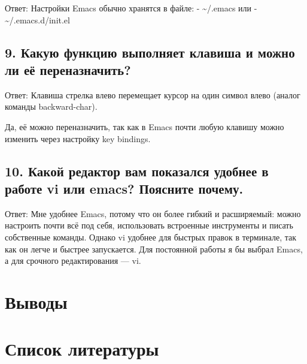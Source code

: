 \documentclass[
  english,
  russian,
  12pt,
  a4paper,
]{scrreprt}
\begin{document}
Ответ: Настройки Emacs обычно хранятся в файле: - \textasciitilde/.emacs
или - \textasciitilde/.emacs.d/init.el

\section{9. Какую функцию выполняет клавиша и можно ли её
переназначить?}\label{ux43aux430ux43aux443ux44e-ux444ux443ux43dux43aux446ux438ux44e-ux432ux44bux43fux43eux43bux43dux44fux435ux442-ux43aux43bux430ux432ux438ux448ux430-ux438-ux43cux43eux436ux43dux43e-ux43bux438-ux435ux451-ux43fux435ux440ux435ux43dux430ux437ux43dux430ux447ux438ux442ux44c}

Ответ: Клавиша стрелка влево перемещает курсор на один символ влево
(аналог команды backward-char).

Да, её можно переназначить, так как в Emacs почти любую клавишу можно
изменить через настройку key bindings.

\section{10. Какой редактор вам показался удобнее в работе vi или emacs?
Поясните
почему.}\label{ux43aux430ux43aux43eux439-ux440ux435ux434ux430ux43aux442ux43eux440-ux432ux430ux43c-ux43fux43eux43aux430ux437ux430ux43bux441ux44f-ux443ux434ux43eux431ux43dux435ux435-ux432-ux440ux430ux431ux43eux442ux435-vi-ux438ux43bux438-emacs-ux43fux43eux44fux441ux43dux438ux442ux435-ux43fux43eux447ux435ux43cux443.}

Ответ: Мне удобнее Emacs, потому что он более гибкий и расширяемый:
можно настроить почти всё под себя, использовать встроенные инструменты
и писать собственные команды. Однако vi удобнее для быстрых правок в
терминале, так как он легче и быстрее запускается. Для постоянной работы
я бы выбрал Emacs, а для срочного редактирования --- vi.

\chapter{Выводы}\label{ux432ux44bux432ux43eux434ux44b}

\chapter*{Список
литературы}\label{ux441ux43fux438ux441ux43eux43a-ux43bux438ux442ux435ux440ux430ux442ux443ux440ux44b}

\protect{}\label{refs}

\printbibliography
\end{document}
